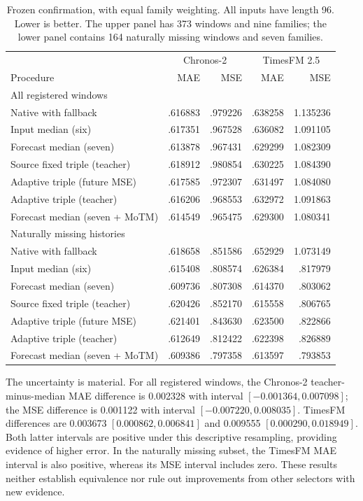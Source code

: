 \documentclass{article}
\begin{document}
\begin{table}[t]
\centering\small
\caption{Frozen confirmation, with equal family weighting. All inputs have length 96. Lower is better. The upper panel has 373 windows and nine families; the lower panel contains 164 naturally missing windows and seven families.}
\label{tab:confirmation}
\begin{tabular}{lrrrr}
\toprule
 & \multicolumn{2}{c}{Chronos-2} & \multicolumn{2}{c}{TimesFM 2.5}\\
Procedure & MAE & MSE & MAE & MSE\\
\midrule
\multicolumn{5}{l}{All registered windows}\\
Native with fallback & .616883 & .979226 & .638258 & 1.135236\\
Input median (six) & .617351 & .967528 & .636082 & 1.091105\\
Forecast median (seven) & .613878 & .967431 & .629299 & 1.082309\\
Source fixed triple (teacher) & .618912 & .980854 & .630225 & 1.084390\\
Adaptive triple (future MSE) & .617585 & .972307 & .631497 & 1.084080\\
Adaptive triple (teacher) & .616206 & .968553 & .632972 & 1.091863\\
Forecast median (seven + MoTM) & .614549 & .965475 & .629300 & 1.080341\\
\midrule
\multicolumn{5}{l}{Naturally missing histories}\\
Native with fallback & .618658 & .851586 & .652929 & 1.073149\\
Input median (six) & .615408 & .808574 & .626384 & .817979\\
Forecast median (seven) & .609736 & .807308 & .614370 & .803062\\
Source fixed triple (teacher) & .620426 & .852170 & .615558 & .806765\\
Adaptive triple (future MSE) & .621401 & .843630 & .623500 & .822866\\
Adaptive triple (teacher) & .612649 & .812422 & .622398 & .826889\\
Forecast median (seven + MoTM) & .609386 & .797358 & .613597 & .793853\\
\bottomrule
\end{tabular}
\end{table}

The uncertainty is material. For all registered windows, the Chronos-2 teacher-minus-median MAE difference is 0.002328 with interval $[-0.001364,0.007098]$; the MSE difference is 0.001122 with interval $[-0.007220,0.008035]$. TimesFM differences are 0.003673 $[0.000862,0.006841]$ and 0.009555 $[0.000290,0.018949]$. Both latter intervals are positive under this descriptive resampling, providing evidence of higher error. In the naturally missing subset, the TimesFM MAE interval is also positive, whereas its MSE interval includes zero. These results neither establish equivalence nor rule out improvements from other selectors with new evidence.
\end{document}
